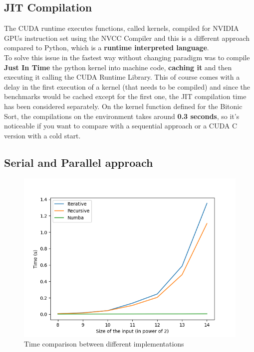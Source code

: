 \documentclass[a4paper, 12pt, oneside]{article}
\begin{document}
\subsection{JIT Compilation}
The CUDA runtime executes functions, called kernels, compiled for NVIDIA GPUs instruction set using the NVCC Compiler \cite{nvcc} and this is a different approach compared to Python, which is a \textbf{runtime interpreted language}.\\
To solve this issue in the fastest way without changing paradigm was to compile \textbf{Just In Time} the python kernel into machine code, \textbf{caching it} and then executing it calling the CUDA Runtime Library.
This of course comes with a delay in the first execution of a kernel (that needs to be compiled) and since the benchmarks would be cached except for the first one, the JIT compilation time has been considered separately.
On the kernel function defined for the Bitonic Sort, the compilations on the environment takes around \textbf{0.3 seconds}, so it's noticeable if you want to compare with a sequential approach or a CUDA C version with a cold start.

\subsection{Serial and Parallel approach}

\begin{figure}[!h]
  \includegraphics[width=400pt]{images/cpu_vs_gpu.png}
  \caption{Time comparison between different implementations}
\end{figure}
\end{document}
